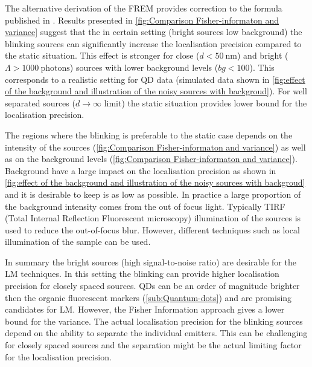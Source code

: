The alternative derivation of the FREM provides correction to the formula published in \cite{Ram2006}. Results presented in \autoref{fig:Comparison Fisher-informaton and variance} suggest that the in certain setting (bright sources low background) the blinking sources can significantly increase the localisation precision compared to the static situation. This effect is stronger for close ($d<50\ \text{nm}$) and bright ($\Lambda>1000\ \text{photons}$) sources with lower background levels ($bg<100$). This corresponds to a realistic setting for QD data (simulated data shown in \autoref{fig:effect of the background and illustration of the noisy sources with backgroud}\ccc). For well separated sources ($d\rightarrow\infty$ limit) the static situation provides lower bound for the localisation precision. 

The regions where the blinking is preferable to the static case depends on the intensity of the sources (\autoref{fig:Comparison Fisher-informaton and variance}\aaa) as well as on the background levels (\autoref{fig:Comparison Fisher-informaton and variance}\bbb). Background have a large impact on the localisation precision as shown in \autoref{fig:effect of the background and illustration of the noisy sources with backgroud} and it is desirable to keep is as low as possible. In practice a large proportion of the background intensity comes from the out of focus light. Typically TIRF (Total Internal Reflection Fluorescent microscopy) illumination of the sources is used to reduce the out-of-focus blur. However, different techniques such as local illumination of the sample can be used. 

In summary the bright sources (high signal-to-noise ratio) are desirable for the LM techniques. In this setting the blinking can provide higher localisation precision for closely spaced sources. QDs can be an order of magnitude brighter then the organic fluorescent markers (\autoref{sub:Quantum-dots}) and are promising candidates for LM. However, the Fisher Information approach gives a lower bound for the variance. The actual localisation precision for the blinking sources depend on the ability to separate the individual emitters. This can be challenging for closely spaced sources and the separation might be the actual limiting factor for the localisation precision.

